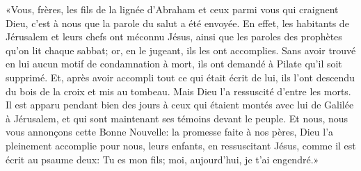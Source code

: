 «Vous, frères, les fils de la lignée d’Abraham
	et ceux parmi vous qui craignent Dieu,
	c’est à nous que la parole du salut a été envoyée.
En effet, les habitants de Jérusalem et leurs chefs ont méconnu Jésus,
	ainsi que les paroles des prophètes qu’on lit chaque sabbat;
	or, en le jugeant, ils les ont accomplies.
Sans avoir trouvé en lui aucun motif de condamnation à mort,
	ils ont demandé à Pilate qu’il soit supprimé.
Et, après avoir accompli tout ce qui était écrit de lui,
	ils l’ont descendu du bois de la croix et mis au tombeau.
	Mais Dieu l’a ressuscité d’entre les morts.
Il est apparu pendant bien des jours
	à ceux qui étaient montés avec lui de Galilée à Jérusalem,
	et qui sont maintenant ses témoins devant le peuple.
Et nous, nous vous annonçons cette Bonne Nouvelle:
	la promesse faite à nos pères,
	Dieu l’a pleinement accomplie pour nous, leurs enfants,
	en ressuscitant Jésus, comme il est écrit au psaume deux:
	Tu es mon fils; moi, aujourd’hui, je t’ai engendré.»
